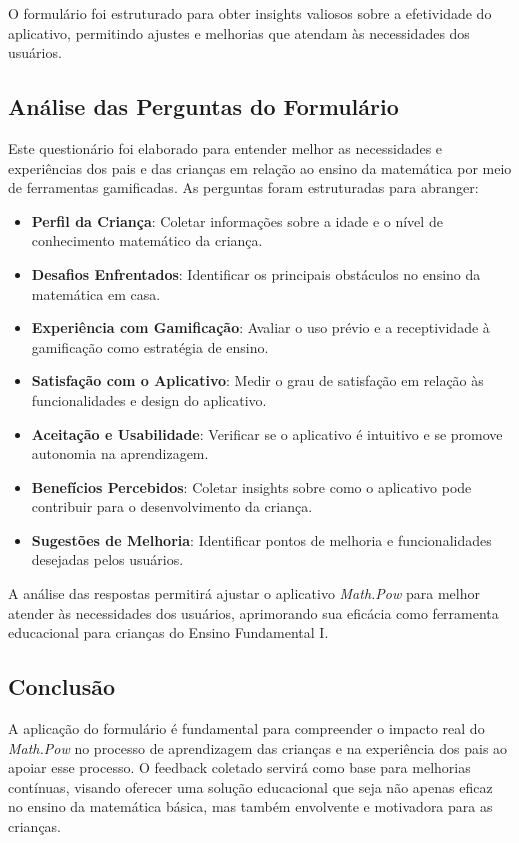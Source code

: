 O formulário foi estruturado para obter insights valiosos sobre a efetividade do aplicativo, permitindo ajustes e melhorias que atendam às necessidades dos usuários.

\subsection{Análise das Perguntas do Formulário}

Este questionário foi elaborado para entender melhor as necessidades e experiências dos pais e das crianças em relação ao ensino da matemática por meio de ferramentas gamificadas. As perguntas foram estruturadas para abranger:

\begin{itemize}
    \item \textbf{Perfil da Criança}: Coletar informações sobre a idade e o nível de conhecimento matemático da criança.
    \item \textbf{Desafios Enfrentados}: Identificar os principais obstáculos no ensino da matemática em casa.
    \item \textbf{Experiência com Gamificação}: Avaliar o uso prévio e a receptividade à gamificação como estratégia de ensino.
    \item \textbf{Satisfação com o Aplicativo}: Medir o grau de satisfação em relação às funcionalidades e design do aplicativo.
    \item \textbf{Aceitação e Usabilidade}: Verificar se o aplicativo é intuitivo e se promove autonomia na aprendizagem.
    \item \textbf{Benefícios Percebidos}: Coletar insights sobre como o aplicativo pode contribuir para o desenvolvimento da criança.
    \item \textbf{Sugestões de Melhoria}: Identificar pontos de melhoria e funcionalidades desejadas pelos usuários.
\end{itemize}

A análise das respostas permitirá ajustar o aplicativo \textit{Math.Pow} para melhor atender às necessidades dos usuários, aprimorando sua eficácia como ferramenta educacional para crianças do Ensino Fundamental I.

\subsection{Conclusão}

A aplicação do formulário é fundamental para compreender o impacto real do \textit{Math.Pow} no processo de aprendizagem das crianças e na experiência dos pais ao apoiar esse processo. O feedback coletado servirá como base para melhorias contínuas, visando oferecer uma solução educacional que seja não apenas eficaz no ensino da matemática básica, mas também envolvente e motivadora para as crianças.
